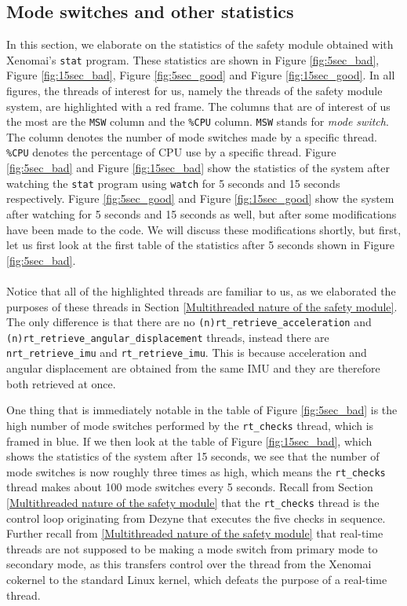 \documentclass[12pt]{scrreprt}
\begin{document}
\subsection{Mode switches and other statistics}
\label{Mode switches and other statistics}
In this section, we elaborate on the statistics of the safety module obtained with Xenomai's \texttt{stat} program. These statistics are shown in Figure \ref{fig:5sec_bad}, Figure \ref{fig:15sec_bad}, Figure \ref{fig:5sec_good} and Figure \ref{fig:15sec_good}. In all figures, the threads of interest for us, namely the threads of the safety module system, are highlighted with a red frame. The columns that are of interest of us the most are the \texttt{MSW} column and the \texttt{\%CPU} column. \texttt{MSW} stands for \textit{mode switch}. The column denotes the number of mode switches made by a specific thread. \texttt{\%CPU} denotes the percentage of CPU use by a specific thread. Figure \ref{fig:5sec_bad} and Figure \ref{fig:15sec_bad} show the statistics of the system after watching the \texttt{stat} program using \texttt{watch} for 5 seconds and 15 seconds respectively. Figure \ref{fig:5sec_good} and Figure \ref{fig:15sec_good} show the system after watching for 5 seconds and 15 seconds as well, but after some modifications have been made to the code. We will discuss these modifications shortly, but first, let us first look at the first table of the statistics after 5 seconds shown in Figure \ref{fig:5sec_bad}.
\\\\
Notice that all of the highlighted threads are familiar to us, as we elaborated the purposes of these threads in Section \ref{Multithreaded nature of the safety module}. The only difference is that there are no \texttt{(n)rt\_retrieve\_acceleration} and \texttt{(n)rt\_retrieve\_angular\_displacement} threads, instead there are \texttt{nrt\_retrieve\_imu} and \texttt{rt\_retrieve\_imu}. This is because acceleration and angular displacement are obtained from the same IMU and they are therefore both retrieved at once.
\par
One thing that is immediately notable in the table of Figure \ref{fig:5sec_bad} is the high number of mode switches performed by the \texttt{rt\_checks} thread, which is framed in blue. If we then look at the table of Figure \ref{fig:15sec_bad}, which shows the statistics of the system after 15 seconds, we see that the number of mode switches is now roughly three times as high, which means the \texttt{rt\_checks} thread makes about 100 mode switches every 5 seconds. Recall from Section \ref{Multithreaded nature of the safety module} that the \texttt{rt\_checks} thread is the control loop originating from Dezyne that executes the five checks in sequence. Further recall from \ref{Multithreaded nature of the safety module} that real-time threads are not supposed to be making a mode switch from primary mode to secondary mode, as this transfers control over the thread from the Xenomai cokernel to the standard Linux kernel, which defeats the purpose of a real-time thread.
\end{document}
